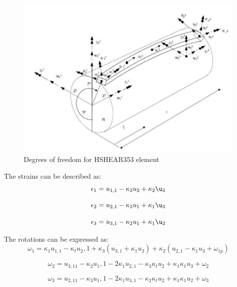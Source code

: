 \begin{figure}[H]
\centering
\includegraphics[scale=0.5]{figures/hshear353}
\caption[$\; \:$HSHEAR353]{Degrees of freedom for HSHEAR353 element \cite{Bflextheory2013} }
 \label{fig:353}
\end{figure}


The strains can be described as:
\begin{equation}
    \epsilon_1=u_{1,1}-\kappa_3 u_2 + \kappa_2 \u_3
\end{equation}

\begin{equation}
    \epsilon_2=u_{2,1}-\kappa_3 u_1 + \kappa_1 \u_3
\end{equation}

\begin{equation}
    \epsilon_3=u_{3,1}-\kappa_2 u_1 + \kappa_1 \u_2
\end{equation}

The rotations can be expressed as:
\begin{equation}
    \omega_1=\kappa_1u_{1,1}-\kappa_t u_2,1 +\kappa_3(u_{3,1} + \kappa_1 u_2) + \kappa_2(u_{2,1}-\kappa_1 u_3 + \omega_{1p})
\end{equation}

\begin{equation}
    \omega_2=u_{3,11}-\kappa_2 u_1,1 -2\kappa_1u_{2,1} - \kappa_3 \kappa_t u_2 + \kappa_1 \kappa_1 u_{3} + \omega_{2}
\end{equation}

\begin{equation}
    \omega_3=u_{2,11}-\kappa_3 u_1,1 -2\kappa_1u_{3,1} - \kappa_2 \kappa_t u_2 + \kappa_1 \kappa_1 u_{2} + \omega_{3}
\end{equation}

